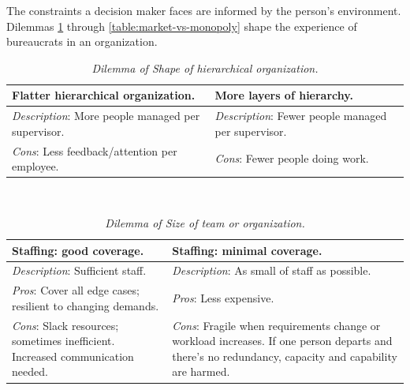 The constraints a decision maker faces are informed by the person's environment. Dilemmas \ref{table:people-per-supervisor} through \ref{table:market-vs-monopoly} shape the experience of bureaucrats in an organization.

\begin{center}
\begin{table}[H] %
\begin{tabular}{ | m{\dilemmatablewidth}| m{\dilemmatablewidth} | } 
  \hline
  \textbf{Flatter hierarchical organization.} &
  \textbf{More layers of hierarchy.} \\ 
  \hline
  \textit{Description}: More people managed per supervisor. & 
  \textit{Description}: Fewer people managed per supervisor. \\ 
  \hline
  \textit{Cons}: Less feedback/attention per employee. & 
  \textit{Cons}: Fewer people doing work. \\  
  \hline
\end{tabular}
\caption{\textit{Dilemma of Shape of hierarchical organization.}
}
\label{table:people-per-supervisor}
\end{table}
\end{center}

\ \\

\begin{center}
\begin{table}[H] %
\begin{tabular}{ | m{\dilemmatablewidth}| m{\dilemmatablewidth} | } 
  \hline
  \textbf{Staffing: good coverage.} &
  \textbf{Staffing: minimal coverage.} \\
  \hline
  \textit{Description}: Sufficient staff. &
  \textit{Description}: As small of staff as possible. \\  
  \hline
  \textit{Pros}: Cover all edge cases; resilient to changing demands. &
  \textit{Pros}: Less expensive. \\
  \hline
  \textit{Cons}: Slack resources; sometimes inefficient. Increased communication needed. & 
  \textit{Cons}: Fragile when requirements change or workload increases. If one person departs and there's no redundancy, capacity and capability are harmed.  \\
  \hline
\end{tabular}
\caption{\textit{Dilemma of Size of team or organization.}
}
\label{table:staff_many-vs-few}
\end{table}
\end{center}


